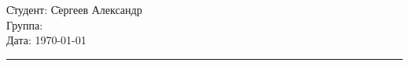\begin{tabbing}
	\hspace{11cm} \= Студент: \= Сергеев Александр \\
	\> Группа:  \\
	\> Дата: \> \today
\end{tabbing}
\hrule
\vspace{1cm}